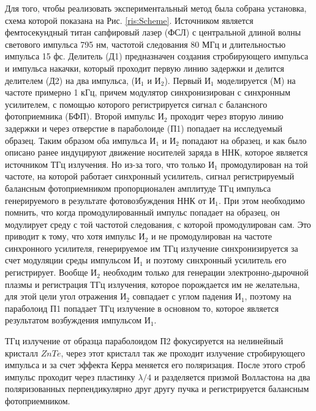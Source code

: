 \documentclass[a4paper,14pt,russian]{extreport}
\begin{document}
			Для того, чтобы реализовать экспериментальный метод была собрана установка, схема которой показана на Рис.  \ref{ris:Scheme}. Источником является фемтосекундный титан сапфировый лазер (ФСЛ) с центральной длиной волны светового импульса 795 нм, частотой следования 80 МГц и длительностью импульса 15 фс. Делитель (Д1) предназначен создания стробирующего импульса и импульса накачки, который проходит первую линию задержки и делится делителем (Д2) на два импульса, ($\text{И}_1$ и $\text{И}_2$). Первый $\text{И}_1$ моделируется (М) на частоте примерно 1 кГц, причем модулятор синхронизирован с синхронным усилителем, с помощью которого регистрируется сигнал с балансного фотоприемника (БФП). Второй импульс $\text{И}_2$ проходит через вторую линию задержки и через отверстие в параболоиде (П1) попадает на исследуемый образец. Таким образом оба импульса $\text{И}_1$ и $\text{И}_2$ попадают на образец, и как было описано ранее индуцируют движение носителей заряда в ННК, которое является источником ТГц излучения. Но из-за того, что только $\text{И}_1$ промодулирован на той частоте, на которой работает синхронный усилитель, сигнал регистрируемый балансным фотоприемником пропорционален амплитуде ТГц импульса генерируемого в результате фотовозбуждения ННК от $\text{И}_1$. При этом необходимо помнить, что когда промодулированный импульс попадает на образец, он модулирует среду с той частотой следования, с которой промодулирован сам. Это приводит к тому, что хотя импульс $\text{И}_2$ и не промодулирован на частоте синхронного усилителя, генерируемое им ТГц излучение синхронизируется за счет модуляции среды импульсом $\text{И}_1$ и поэтому синхронный усилитель его регистрирует. Вообще $\text{И}_2$ необходим только для генерации электронно-дырочной плазмы и регистрация ТГц излучения, которое порождается им не желательна, для этой цели угол отражения $\text{И}_2$ совпадает с углом падения $\text{И}_1$, поэтому на параболоид П1 попадает ТГц излучение в основном то, которое является результатом возбуждения импульсом $\text{И}_1$.\par
			ТГц излучение от образца параболоидом П2 фокусируется на нелинейный кристалл $ZnTe$, через этот кристалл так же проходит излучение стробирующего импульса и за счет эффекта Керра меняется его поляризация. После этого строб импульс проходит через пластинку $\lambda/4$ и разделяется призмой Волластона на два поляризованных перпендикулярно друг другу пучка и регистрируется балансным фотоприемником.\par
\end{document}
